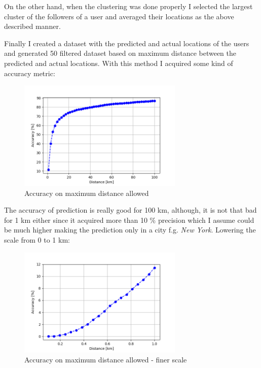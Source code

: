 \documentclass[a4paper,12pt]{article}
\begin{document}
\par On the other hand, when the clustering was done properly I selected the largest cluster of
the followers of a user and averaged their locations as the above described manner.

\vspace{.2cm}

\par Finally I created a dataset with the predicted and actual locations of the users
and generated 50 filtered dataset based on maximum distance between the predicted and actual 
locations. With this method I acquired some kind of accuracy metric:

\vspace{.2cm}

\begin{figure}[H]
	\centering
	\includegraphics[width=0.7\textwidth]{./accuracy-distance.png}
	\caption{Accuracy on maximum distance allowed}
\end{figure}

\vspace{.2cm}

\par The accuracy of prediction is really good for 100 km, although, it is not that bad for
1 km either since it acquired more than 10 \% precision which I assume could be much higher
making the prediction only in a city f.g. \textit{New York}. Lowering the scale from 0 to 1 km:

\vspace{.2cm}

\begin{figure}[H]
	\centering
	\includegraphics[width=0.7\textwidth]{./fine-accuracy-distance.png}
	\caption{Accuracy on maximum distance allowed - finer scale}
\end{figure}
\end{document}
